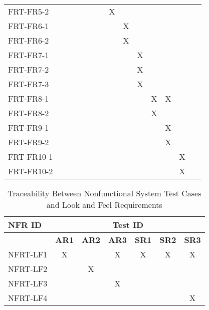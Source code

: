 \documentclass[12pt, titlepage]{article}
\begin{document}
\begin{landscape}
\begin{longtable}{|l|ccccccccccc|}
    FRT-FR5-2 & ~ & ~ & ~ & ~ & X & ~ & ~ & ~ & ~ & ~ & ~ \\
    FRT-FR6-1 & ~ & ~ & ~ & ~ & ~ & X & ~ & ~ & ~ & ~ & ~ \\
    FRT-FR6-2 & ~ & ~ & ~ & ~ & ~ & X & ~ & ~ & ~ & ~ & ~ \\
    FRT-FR7-1 & ~ & ~ & ~ & ~ & ~ & ~ & X & ~ & ~ & ~ & ~ \\
    FRT-FR7-2 & ~ & ~ & ~ & ~ & ~ & ~ & X & ~ & ~ & ~ & ~ \\
    FRT-FR7-3 & ~ & ~ & ~ & ~ & ~ & ~ & X & ~ & ~ & ~ & ~ \\
    FRT-FR8-1 & ~ & ~ & ~ & ~ & ~ & ~ & ~ & X & X & ~ & ~ \\
    FRT-FR8-2 & ~ & ~ & ~ & ~ & ~ & ~ & ~ & X & ~ & ~ & ~ \\
    FRT-FR9-1 & ~ & ~ & ~ & ~ & ~ & ~ & ~ & ~ & X & ~ & ~ \\
    FRT-FR9-2 & ~ & ~ & ~ & ~ & ~ & ~ & ~ & ~ & X & ~ & ~ \\
    FRT-FR10-1 & ~ & ~ & ~ & ~ & ~ & ~ & ~ & ~ & ~ & X & ~ \\
    FRT-FR10-2 & ~ & ~ & ~ & ~ & ~ & ~ & ~ & ~ & ~ & X & ~ \\
    \hline
  \end{longtable}

  \newpage

  \begin{longtable}{|l|cccccc|}
		\caption{Traceability Between Nonfunctional System Test Cases and Look and Feel Requirements} \\
		\hline
    \textbf{NFR ID}   & \multicolumn{6}{c|}{\textbf{Test ID}} \\
    \hline
    ~ & \textbf{AR1} & \textbf{AR2} & \textbf{AR3} & \textbf{SR1} & \textbf{SR2} & \textbf{SR3} \\
    \hline
    NFRT-LF1 & X & ~ & X & X & X & X \\
    NFRT-LF2 & ~ & X & ~ & ~ & ~ & ~ \\
    NFRT-LF3 & ~ & ~ & X & ~ & ~ & ~ \\
    NFRT-LF4 & ~ & ~ & ~ & ~ & ~ & X \\
    \hline
  \end{longtable}


\end{landscape}
\end{document}
